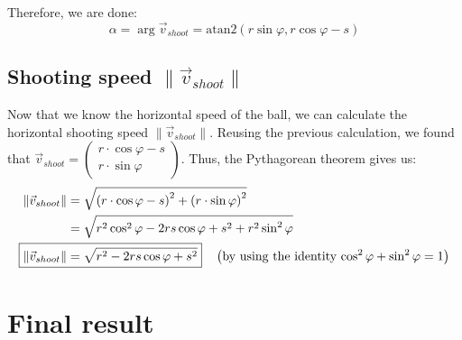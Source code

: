 \documentclass[11pt]{report}
\begin{document}
Therefore, we are done:
\[
	\boxed{
		\alpha = \arg \vec{v}_{shoot} = \mathrm{atan2}\left(r\sin\varphi, r\cos \varphi - s\right)
	}
\]

\subsection{Shooting speed \texorpdfstring{$\|\vec{v}_{shoot}\|$}{||v\_shoot||}}

Now that we know the horizontal speed of the ball, we can calculate the horizontal shooting speed $\|\vec{v}_{shoot}\|$. Reusing the previous calculation, we found that $\vec{v}_{shoot} = \begin{pmatrix}
		r \cdot \cos \varphi - s \\
		r \cdot \sin \varphi
	\end{pmatrix}$. Thus, the Pythagorean theorem gives us:
\[
	\begin{aligned}
		\|\vec{v}_{shoot}\|         & = \sqrt{{(r \cdot \cos \varphi - s)}^2 + {(r \cdot \sin \varphi)}^2}                                                          \\
		                            & = \sqrt{r^2\cos^2\varphi - 2rs\cos\varphi + s^2 + r^2\sin^2\varphi}                                                           \\
		\Aboxed{\|\vec{v}_{shoot}\| & = \sqrt{r^2 - 2rs\cos\varphi + s^2}}      \quad \left(\text{by using the identity $\cos^2\varphi + \sin^2\varphi = 1$}\right) \\
	\end{aligned}
\]


\section{Final result}\label{sec:final_result}
\end{document}
